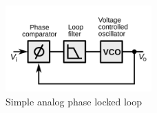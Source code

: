\begin{figure}[h]
      \centering
      \includegraphics[width=0.5\textwidth]{figs/Phase_locked_loop.png}      \vspace{-0.3cm}
      \caption[]{ Simple analog phase locked loop}
      \label{fig:pll_1}
\end{figure}    